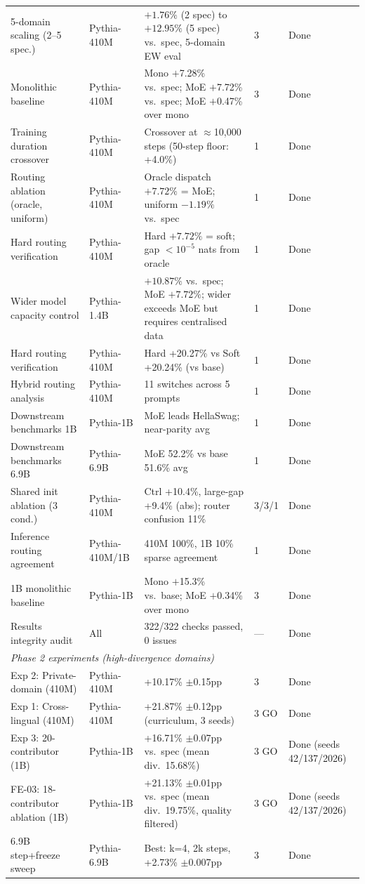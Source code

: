 \documentclass{article}
\begin{document}
\begin{table}[h]
{\begin{tabular}{p{5.0cm}p{2.8cm}p{5.5cm}p{1.8cm}p{3.5cm}}
5-domain scaling (2--5 spec.) & Pythia-410M & $+1.76\%$ (2 spec) to $+12.95\%$ (5 spec) vs.\ spec, 5-domain EW eval & 3 & Done \\
Monolithic baseline & Pythia-410M & Mono $+$7.28\% vs.\ spec; MoE $+$7.72\% vs.\ spec; MoE $+$0.47\% over mono & 3 & Done \\
Training duration crossover & Pythia-410M & Crossover at $\approx$10,000 steps (50-step floor: +4.0\%) & 1 & Done \\
Routing ablation (oracle, uniform) & Pythia-410M & Oracle dispatch $+7.72\%$ = MoE; uniform $-1.19\%$ vs.\ spec & 1 & Done \\
Hard routing verification & Pythia-410M & Hard $+7.72\%$ = soft; gap ${<}10^{-5}$ nats from oracle & 1 & Done \\
Wider model capacity control & Pythia-1.4B & $+10.87\%$ vs.\ spec; MoE $+7.72\%$; wider exceeds MoE but requires centralised data & 1 & Done \\
Hard routing verification & Pythia-410M & Hard +20.27\% vs Soft +20.24\% (vs base) & 1 & Done \\
Hybrid routing analysis & Pythia-410M & 11 switches across 5 prompts & 1 & Done \\
Downstream benchmarks 1B & Pythia-1B & MoE leads HellaSwag; near-parity avg & 1 & Done \\
Downstream benchmarks 6.9B & Pythia-6.9B & MoE 52.2\% vs base 51.6\% avg & 1 & Done \\
Shared init ablation (3 cond.) & Pythia-410M & Ctrl +10.4\%, large-gap +9.4\% (abs); router confusion 11\% & 3/3/1 & Done \\
Inference routing agreement & Pythia-410M/1B & 410M 100\%, 1B 10\% sparse agreement & 1 & Done \\
1B monolithic baseline & Pythia-1B & Mono $+$15.3\% vs.\ base; MoE $+$0.34\% over mono & 3 & Done \\
Results integrity audit & All & 322/322 checks passed, 0 issues & --- & Done \\
\midrule
\multicolumn{5}{l}{\textit{Phase 2 experiments (high-divergence domains)}} \\
\midrule
Exp 2: Private-domain (410M) & Pythia-410M & +10.17\% $\pm$0.15pp & 3 & Done \\
Exp 1: Cross-lingual (410M) & Pythia-410M & +21.87\% $\pm$0.12pp (curriculum, 3 seeds) & 3 GO & Done \\
Exp 3: 20-contributor (1B) & Pythia-1B & +16.71\% $\pm$0.07pp vs.\ spec (mean div.\ 15.68\%) & 3 GO & Done (seeds 42/137/2026) \\
FE-03: 18-contributor ablation (1B) & Pythia-1B & +21.13\% $\pm$0.01pp vs.\ spec (mean div.\ 19.75\%, quality filtered) & 3 GO & Done (seeds 42/137/2026) \\
6.9B step+freeze sweep & Pythia-6.9B & Best: k=4, 2k steps, +2.73\% $\pm$0.007pp & 3 & Done \\
\bottomrule
\end{tabular}%
}
\end{table}
\end{document}
